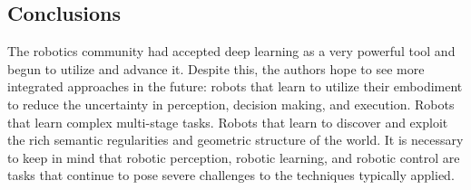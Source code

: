 \subsection{Conclusions}\label{header-n96}

The robotics community had accepted deep learning as a very powerful
tool and begun to utilize and advance it. Despite this, the authors hope
to see more integrated approaches in the future: robots that learn to
utilize their embodiment to reduce the uncertainty in perception,
decision making, and execution. Robots that learn complex multi-stage
tasks. Robots that learn to discover and exploit the rich semantic
regularities and geometric structure of the world. It is necessary to
keep in mind that robotic perception, robotic learning, and robotic
control are tasks that continue to pose severe challenges to the
techniques typically applied.